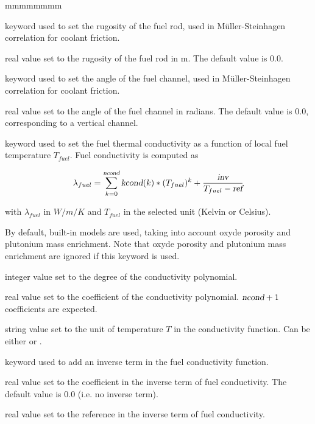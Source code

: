 \begin{ListeDeDescription}{mmmmmmmm}
\item[\moc{F-RUG}] keyword used to set the rugosity of the fuel rod, used in M\"uller-Steinhagen correlation for coolant friction.

\item[\dusa{epsr}] real value set to the rugosity of the fuel rod in m. The default value is 0.0.

\item[\moc{THETA}] keyword used to set the angle of the fuel channel, used in M\"uller-Steinhagen correlation for coolant friction.

\item[\dusa{theta}] real value set to the angle of the fuel channel in radians. The default value is 0.0, corresponding to a vertical channel.

\item[\moc{CONDF}] keyword used to set the fuel thermal conductivity as a function of local fuel temperature $T_{fuel}$.
Fuel conductivity is computed as

$$\lambda_{fuel} = \sum_{k=0}^{\dusa{ncond}} {\dusa{kcond}(k)*(T_{fuel})^k + \frac{\dusa{inv}}{T_{fuel}-\dusa{ref}}}$$

with $\lambda_{fuel}$ in $W/m/K$ and $T_{fuel}$ in the selected unit (Kelvin or Celsius).

By default, built-in models are used, taking into account oxyde porosity and plutonium mass enrichment.
Note that oxyde porosity and plutonium mass enrichment are ignored if this keyword is used.

\item[\dusa{ncond}] integer value set to the degree of the conductivity polynomial.

\item[\dusa{kcond}] real value set to the coefficient of the conductivity polynomial. $\dusa{ncond}+1$ coefficients are expected.

\item[\dusa{unit}] string value set to the unit of temperature $T$ in the conductivity function. Can be either  or .

\item[\moc{INV}] keyword used to add an inverse term in the fuel conductivity function.

\item[\dusa{inv}] real value set to the coefficient in the inverse term of fuel conductivity.
The default value is 0.0 (i.e. no inverse term).

\item[\dusa{ref}] real value set to the reference in the inverse term of fuel conductivity.


\end{ListeDeDescription}
